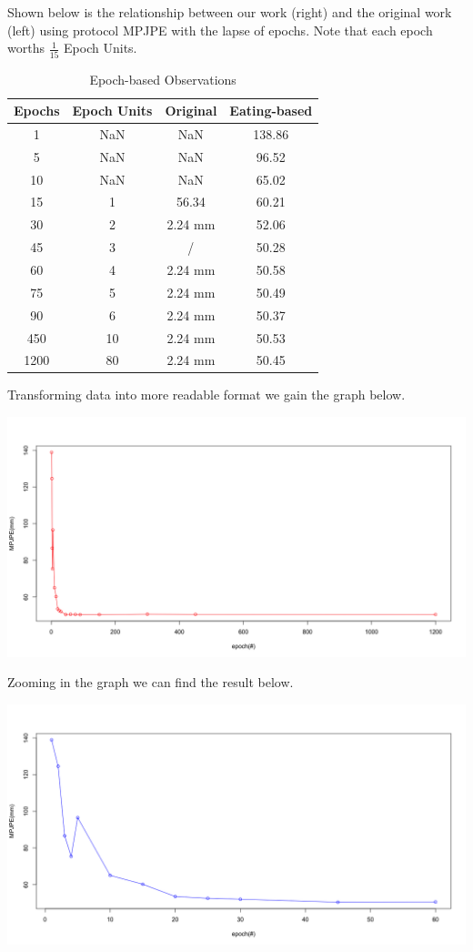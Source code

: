 \documentclass[10pt,twocolumn,letterpaper]{article}
\begin{document}
Shown below is the relationship between our work (right) and the original work (left) using protocol MPJPE with the
lapse of epochs.
Note that each epoch worths $\frac{1}{15}$ Epoch Units.

\begin{table}[H]
\caption{Epoch-based Observations}
\centering
\begin{tabular}{cccc}
\hline
Epochs & Epoch Units & Original & Eating-based\\
\hline

1& NaN & NaN & 138.86 \\
5& NaN & NaN & 96.52  \\
10& NaN & NaN & 65.02  \\
15& 1 & 56.34 & 60.21 \\
30& 2 & 2.24 mm & 52.06 \\
45& 3 & / & 50.28  \\
60& 4 & 2.24 mm & 50.58  \\
75& 5 & 2.24 mm & 50.49  \\
90& 6 & 2.24 mm & 50.37 \\
450& 10 & 2.24 mm & 50.53 \\
1200& 80 & 2.24 mm & 50.45 \\


\hline
\end{tabular}
\end{table}

Transforming data into more readable format we gain the graph below.

\includegraphics[scale=0.18]{MPJPE_epoch_overall.png}

Zooming in the graph we can find the result below.

\includegraphics[scale=0.18]{MPJPE_epoch_zoomed.png}
\end{document}
